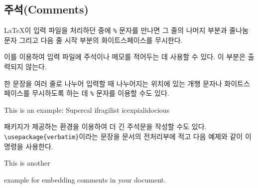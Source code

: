 \subsection{주석(Comments)} 

\LaTeX 이 입력 파일을 처리하던 중에 \verb|%| 문자를 만나면 그 줄의 나머지 부분과 줄나눔 문자 그리고 다음 줄 시작 부분의 화이트스페이스를 
무시한다.

이를 이용하여 입력 파일에 주석이나 메모를 적어두는 데 사용할 수 있다. 이 부분은 출력되지 않는다.

한 문장을 여러 줄로 나누어 입력할 때 나누어지는 위치에 있는 개행 문자나 화이트스페이스를 
무시하도록 하는 데 \texttt{\%} 문자를 이용할 수도 있다.

\begin{example}
This is an %
example: Supercal%
              ifragilist%
    icexpialidocious
\end{example}


 패키지가 제공하는  환경을 이용하여 더 긴 주석문을 작성할 수도 있다.
\verb|\usepackage{verbatim}|이라는 문장을 문서의 전처리부에 적고 다음 예제와 같이 이 명령을 사용한다.

\begin{example}
This is another
\begin{comment}
rather stupid,
but helpful
\end{comment}
example for embedding
comments in your document.
\end{example}

